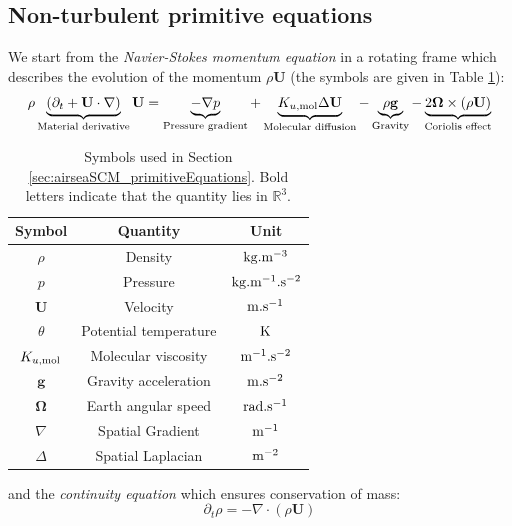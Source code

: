 \subsection{Non-turbulent primitive equations}
\label{sec:airseaSCM_nonTurbulentPrimitiveEq}
We start from the \textit{Navier-Stokes momentum equation}
in a rotating frame
which describes the evolution of the momentum $\rho \mathbf{U}$
(the symbols are given in Table
\ref{tab:airseaSCM_primitiveEquationsSymbols}):
\begin{equation}
\label{eq:airseaSCM_momentumNavierStokes}
\rho \underbrace{
\left(\partial_t + \mathbf{U} \cdot \nabla \right)
	}_{\text{Material derivative}} \mathbf{U}
=
\underbrace{
	- \nabla p
}_{\text{Pressure gradient}}
+
\underbrace{
	K_{u, {\rm mol}} \Delta \mathbf{U}
}_{\text{Molecular diffusion}}
-
\underbrace{
	\rho \mathbf{g}
}_{\text{Gravity}}
-
\underbrace{
2 \mathbf{\Omega} \times (\rho \mathbf{U})
}_{\text{Coriolis effect}}
\end{equation}
\begin{table}
\centering
\begin{tabular}{c|c|c}
Symbol & Quantity & Unit \\
\hline
$\rho$& {Density} & ${\rm kg}.{\rm m}^{-3}$ \\
$p$   & {Pressure} & ${\rm kg}.{\rm m}^{-1}.{\rm s}^{-2}$ \\
$\mathbf{U}$ & {Velocity}& ${\rm m}.{\rm s}^{-1}$ \\
$\theta$ & {Potential temperature}& ${\rm K}$ \\
$K_{u, {\rm mol}}$ & {Molecular viscosity}& ${\rm m}^{-1}.{\rm s}^{-2}$ \\
$\mathbf{g}$ & {Gravity acceleration}& ${\rm m}.{\rm s}^{-2}$ \\
$\mathbf{\Omega}$ & {Earth angular speed}& ${\rm rad}.{\rm s}^{-1}$ \\
$\nabla$ & {Spatial Gradient} & ${\rm m}^{-1}$\\
$\Delta$ & {Spatial Laplacian} &${\rm m}^{-2}$
\end{tabular}
\caption{Symbols used in Section
\ref{sec:airseaSCM_primitiveEquations}. Bold letters
indicate that the quantity lies in $\mathbb{R}^3$.}
\label{tab:airseaSCM_primitiveEquationsSymbols}
\end{table}
and the \textit{continuity equation} which ensures
conservation of mass:
\begin{equation}
\label{eq:airseaSCM_conservationMass}
\partial_t \rho = - \nabla \cdot (\rho \mathbf{U})
\end{equation}
